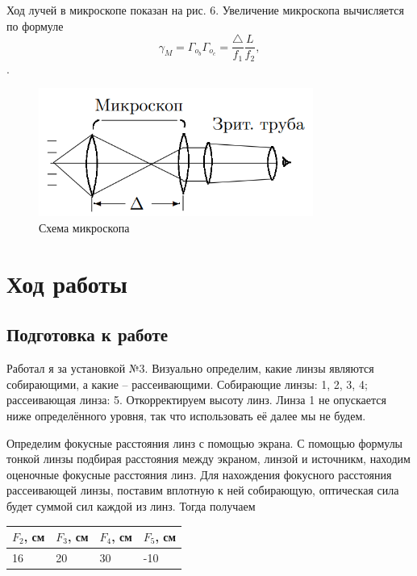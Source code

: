 \documentclass[a4paper,12pt]{article}
\theoremstyle{definition}
\begin{document}
Ход лучей в микроскопе показан на рис. 6. Увеличение микроскопа вычисляется по формуле
    \begin{equation}
        \gamma_M = \Gamma_{o_b} \Gamma_{o_c} = \frac{\triangle}{f_1} \frac{L}{f_2},
    \end{equation}.
    
    \begin{figure}[h]
    \centering
    \includegraphics[width=9cm]{micro_2.PNG}
    \caption{Схема микроскопа}
    \label{fig:vac}
\end{figure}    
    

\newpage
\section{Ход работы}
\subsection{Подготовка к работе}
\par Работал я за установкой №3. Визуально определим, какие линзы являются собирающими, а какие -- рассеивающими. Собирающие линзы: 1, 2, 3, 4; рассеивающая линза: 5. Откорректируем высоту линз. Линза 1 не опускается ниже определённого уровня, так что использовать её далее мы не будем.
\par Определим фокусные расстояния линз с помощью экрана. С помощью формулы тонкой линзы подбирая расстояния между экраном, линзой и источникм, находим оценочные фокусные расстояния линз. Для нахождения фокусного расстояния рассеивающей линзы, поставим вплотную к ней собирающую, оптическая сила будет суммой сил каждой из линз. Тогда получаем

\begin{table}[h!]
\centering
\begin{tabular}{|l|l|l|l|}
\hline
$F_2$, см  & $F_3$, см & $F_4$, см  & $F_5$, см  \\ \hline
16 & 20 & 30 & -10 \\ \hline
\end{tabular}
\end{table}
\end{document}
